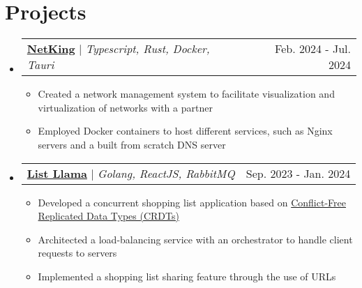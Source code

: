 \documentclass[a4paper,11pt]{article}
\makeatletter
\newcommand{\resumeItem}[1]{
  \item\small{
    {#1 \vspace{-2pt}}
  }
}
\newcommand{\resumeProjectHeading}[2]{
    \item
    \begin{tabular*}{0.97\textwidth}{l@{\extracolsep{\fill}}r}
      \small#1 & #2 \\
    \end{tabular*}\vspace{-7pt}
}
\newcommand{\resumeSubHeadingListStart}{\begin{itemize}[leftmargin=0.15in, label={}]}
\newcommand{\resumeSubHeadingListEnd}{\end{itemize}}
\newcommand{\resumeItemListStart}{\begin{itemize}}
\newcommand{\resumeItemListEnd}{\end{itemize}\vspace{-5pt}}
\makeatother
\begin{document}


\section{Projects}
\resumeSubHeadingListStart
      \resumeProjectHeading
          {\textbf{\href{https://github.com/matilde-silva-21/grs_project}{NetKing}} $|$ \emph{Typescript, Rust, Docker, Tauri}}{Feb. 2024 - Jul. 2024}
          \resumeItemListStart
            \resumeItem{Created a network management system to facilitate visualization and virtualization of networks with a partner}
            \resumeItem{Employed Docker containers to host different services, such as Nginx servers and a built from scratch DNS server}
          \resumeItemListEnd
      \resumeProjectHeading
          {\textbf{\href{https://github.com/matilde-silva-21/SDLE_project}{List Llama}} $|$ \emph{Golang, ReactJS, RabbitMQ}}{Sep. 2023 - Jan. 2024}
          \resumeItemListStart
            \resumeItem{Developed a concurrent shopping list application based on \href{https://crdt.tech/}{Conflict-Free Replicated Data Types (CRDTs)}}
            \resumeItem{Architected a load-balancing service with an orchestrator to handle client requests to servers}
            \resumeItem{Implemented a shopping list sharing feature through the use of URLs}
          \resumeItemListEnd
    \resumeSubHeadingListEnd
\leavevmode \\ %
\end{document}
